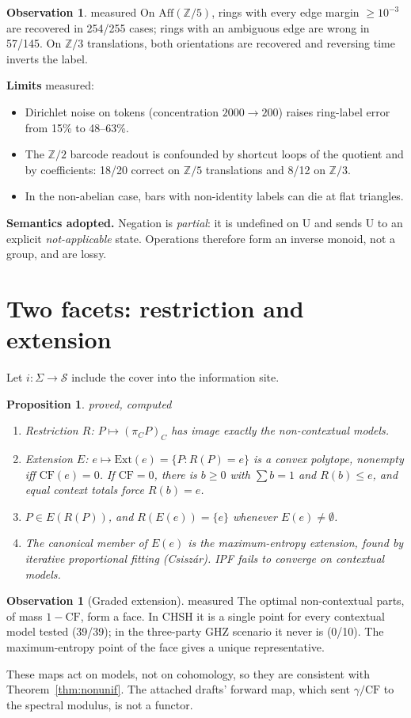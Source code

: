 \documentclass[11pt]{article}
\newtheorem{proposition}[theorem]{Proposition}
\theoremstyle{definition}
\newtheorem{observation}[theorem]{Observation}
\theoremstyle{remark}
\newcommand{\Z}{\mathbb{Z}}
\newcommand{\CF}{\mathrm{CF}}
\newcommand{\Aff}{\mathrm{Aff}}
\newcommand{\st}[1]{\textsf{\small\color{gray}#1}}
\begin{document}
\begin{observation}\st{measured}
On $\Aff(\Z/5)$, rings with every edge margin $\ge10^{-3}$ are recovered in 254/255 cases; rings with an ambiguous edge are wrong in 57/145. On $\Z/3$ translations, both orientations are recovered and reversing time inverts the label.
\end{observation}
\noindent\textbf{Limits} \st{measured}:
\begin{itemize}
  \item Dirichlet noise on tokens (concentration $2000\to200$) raises ring-label error from 15\% to 48--63\%.
  \item The $\Z/2$ barcode readout is confounded by shortcut loops of the quotient and by coefficients: 18/20 correct on $\Z/5$ translations and 8/12 on $\Z/3$.
  \item In the non-abelian case, bars with non-identity labels can die at flat triangles.
\end{itemize}
\noindent\textbf{Semantics adopted.} Negation is \emph{partial}: it is undefined on U and sends U to an explicit \emph{not-applicable} state. Operations therefore form an inverse monoid, not a group, and are lossy.

\section{Two facets: restriction and extension}\label{sec:functors}
Let $i:\Sigma\to\mathcal S$ include the cover into the information site.
\begin{proposition}\st{proved, computed}
\begin{enumerate}
  \item \emph{Restriction} $R$: $P\mapsto(\pi_C P)_C$ has image exactly the non-contextual models.
  \item \emph{Extension} $E$: $e\mapsto\mathrm{Ext}(e)=\{P:R(P)=e\}$ is a convex polytope, nonempty iff $\CF(e)=0$. If $\CF=0$, there is $b\ge0$ with $\sum b=1$ and $R(b)\le e$, and equal context totals force $R(b)=e$.
  \item $P\in E(R(P))$, and $R(E(e))=\{e\}$ whenever $E(e)\ne\emptyset$.
  \item The canonical member of $E(e)$ is the maximum-entropy extension, found by iterative proportional fitting (Csisz\'ar). IPF fails to converge on contextual models.
\end{enumerate}
\end{proposition}
\begin{observation}[Graded extension]\st{measured}
The optimal non-contextual parts, of mass $1-\CF$, form a face. In CHSH it is a single point for every contextual model tested (39/39); in the three-party GHZ scenario it never is (0/10). The maximum-entropy point of the face gives a unique representative.
\end{observation}
\noindent These maps act on models, not on cohomology, so they are consistent with Theorem~\ref{thm:nonunif}. The attached drafts' forward map, which sent $\gamma/\CF$ to the spectral modulus, is not a functor.
\end{document}
